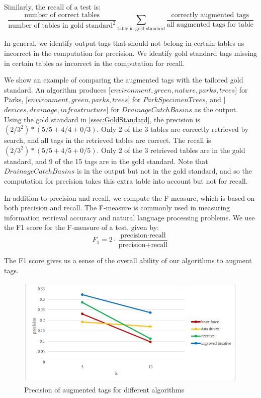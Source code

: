 Similarly, the recall of a test is:
\[
\frac{\text{number of correct tables}}{\text{number of tables in gold standard}^{2}}\sum\limits _{\text{table in gold standard}}\frac{\text{correctly augmented tags}}{\text{all augmented tags for table}}
\]

In general, we identify output tags that should not belong in certain tables as incorrect in the computation for precision. We identify gold standard tags missing in certain tables as incorrect in the computation for recall.

We show an example of comparing the augmented tags with the tailored gold standard. An algorithm produces [$environment,green,nature,parks,trees$] for Parks, [$environment, green, parks, trees$] for $ParkSpecimenTrees$, and [$devices, drainage, infrastructure$] for $DrainageCatchBasins$ as the output. Using the gold standard in \autoref{ssec:GoldStandard}, the precision is $(2/3^{2})*(5/5+4/4+0/3)$. Only 2 of the 3 tables are correctly retrieved by search, and all tags in the retrieved tables are correct. The recall is $(2/3^{2})*(5/5 + 4/5 + 0/5)$. Only 2 of the 3 retrieved tables are in the gold standard, and 9 of the 15 tags are in the gold standard. Note that $DrainageCatchBasins$ is in the output but not in the gold standard, and so the computation for precision takes this extra table into account but not for recall.

In addition to precision and recall, we compute the F-measure, which is based on both precision and recall. The F-measure is commonly used in measuring information retrieval accuracy and natural language processing problems. We use the F1 score for the F-measure of a test, given by:
\[
\ensuremath{F_{1}}=2\ensuremath{\cdot}\frac{\text{precision}\cdot\text{recall}}{\text{precision}+\text{recall}}
\]

The F1 score gives us a sense of the overall ability of our algorithms to augment tags.

\begin{figure}
    \centering
    \includegraphics[width=5in]{figures/precision-different-algorithms.png}
    \caption{Precision of augmented tags for different algorithms}
    \label{fig:precision-different-algorithms}
\end{figure}

